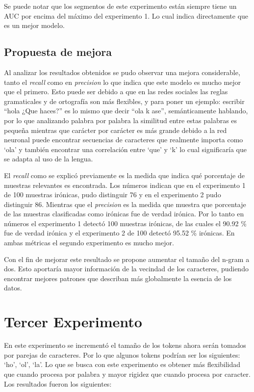 \par Se puede notar que los segmentos de este experimento están siempre tiene un AUC por encima del máximo del experimento 1. Lo cual indica directamente que es un mejor modelo.

\subsection{Propuesta de mejora} %

\par Al analizar los resultados obtenidos se pudo observar una mejora considerable, tanto el \textit{recall} como en \textit{precision} lo que indica que este modelo es mucho mejor que el primero. Esto puede ser debido a que en las redes sociales las reglas gramaticales y de ortografía son más flexibles, y para poner un ejemplo: escribir
``hola ¿Que haces?'' es lo mismo que decir ``ola k ase'', semánticamente hablando, por lo que analizando palabra por palabra la similitud entre estas palabras es pequeña mientras que carácter por carácter es más grande debido a la red neuronal puede encontrar secuencias de caracteres que realmente importa como `ola'  y también encontrar una correlación entre `que' y `k' lo cual significaría que se adapta al uso de la lengua.

\par El \textit{recall} como se explicó previamente es la medida que indica qué porcentaje de muestras relevantes es encontrada. Los números indican que en el experimento 1 de 100 muestras irónicas, pudo distinguir 76 y en el experimento 2 pudo distinguir 86. Mientras que el \textit{precision} es la medida que muestra que porcentaje de las muestras clasificadas como irónicas fue de verdad irónica. Por lo tanto en números el experimento 1 detectó 100 muestras irónicas, de las cuales el 90.92 \% fue de verdad irónica y el experimento 2 de 100 detectó 95.52 \% irónicas. En ambas métricas el segundo experimento es mucho mejor.

\par Con el fin de mejorar este resultado se propone aumentar el tamaño del n-gram a dos. Esto aportaría mayor información de la vecindad de los caracteres, pudiendo encontrar mejores patrones que describan más globalmente la esencia de los datos.

\section{Tercer Experimento}
\par En este experimento se incrementó el tamaño de los tokens ahora serán tomados por parejas de caracteres. Por lo que algunos tokens podrían ser los siguientes: `ho', `ol', `la'. Lo que se busca con este experimento es obtener más flexibilidad que cuando procesa por palabra y mayor rigidez que cuando procesa por caracter. Los resultados fueron los siguientes:

